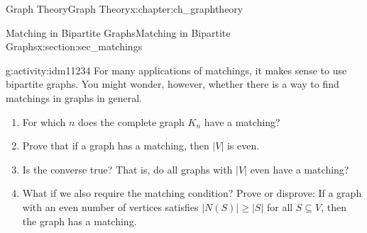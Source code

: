 \documentclass[oneside,10pt,]{book}
\numberwithin{equation}{chapter}
\newcommand{\card}[1]{\left| #1 \right|}
\begin{document}
\begin{chapterptx}{Graph Theory}{}{Graph Theory}{}{}{x:chapter:ch_graphtheory}
\begin{sectionptx}{Matching in Bipartite Graphs}{}{Matching in Bipartite Graphs}{}{}{x:section:sec_matchings}
\begin{activity}{}{g:activity:idm11234}%
For many applications of matchings, it makes sense to use bipartite graphs. You might wonder, however, whether there is a way to find matchings in graphs in general.%
\begin{enumerate}[font=\bfseries,label=(\alph*),ref=\alph*]
\item{}For which \(n\) does the complete graph \(K_n\) have a matching?%
\item{}Prove that if a graph has a matching, then \(\card{V}\) is even.%
\item{}Is the converse true?  That is, do all graphs with \(\card{V}\) even have a matching?%
\item{}What if we also require the matching condition?  Prove or disprove: If a graph with an even number of vertices satisfies \(\card{N(S)} \ge \card{S}\) for all \(S \subseteq V\), then the graph has a matching.%
\end{enumerate}
\end{activity}
\end{sectionptx}
\end{chapterptx}
%
%
%
%
\typeout{************************************************}
\typeout{************************************************}
%
%
\appendix
%
\end{document}
